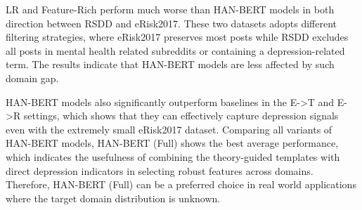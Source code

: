 LR and Feature-Rich perform much worse than HAN-BERT models in both direction between RSDD and eRisk2017. These two datasets adopts different filtering strategies, where eRisk2017 preserves most posts while RSDD excludes all posts in mental health related subreddits or containing a depression-related term. The results indicate that HAN-BERT models are less affected by such domain gap. 

HAN-BERT models also significantly outperform baselines in the E->T and E->R settings, which shows that they can effectively capture depression signals even with the extremely small eRisk2017 dataset. Comparing all variants of HAN-BERT models, HAN-BERT (Full) shows the best average performance, which indicates the usefulness of combining the theory-guided templates with direct depression indicators in selecting robust features across domains. Therefore, HAN-BERT (Full) can be a preferred choice in real world applications where the target domain distribution is unknown.

